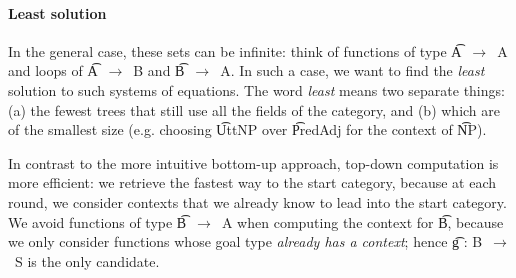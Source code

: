 
\paragraph{Least solution} In the general case, these sets can be
infinite: think of functions of type \t{A~$\rightarrow$~A} and loops
of \t{A~$\rightarrow$~B} and \t{B~$\rightarrow$~A}. In such a case, we
want to find the {\em least} solution to such systems of equations.
The word \emph{least} means two separate things: (a) the fewest
trees that still use all the fields of the category, and (b) which are
of the smallest size (e.g. choosing \t{UttNP} over \t{PredAdj} for the
context of \t{NP}).

In contrast to the more intuitive bottom-up approach, top-down
computation is more efficient: we retrieve the fastest way to the
start category, because at each round, we consider contexts that we
already know to lead into the start category. We avoid functions
of type \t{B~$\rightarrow$~A} when computing the context for \t{B},
because we only consider functions whose goal type \emph{already has a
  context}; hence \t{g : B~$\rightarrow$~S} is the only candidate.




